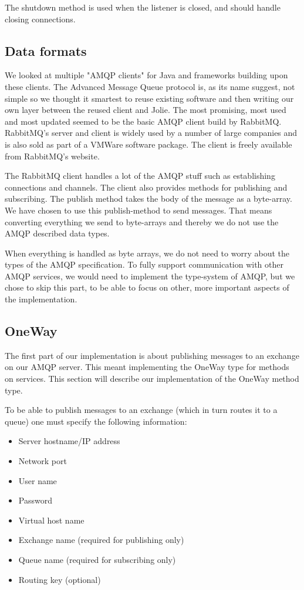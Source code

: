 The shutdown method is used when the listener is closed, and should handle closing connections.

\subsection{Data formats}
We looked at multiple "AMQP clients" for Java and frameworks building upon these clients. The Advanced Message Queue protocol is, as its name suggest, not simple so we thought it smartest to reuse existing software and then writing our own layer between the reused client and Jolie. The most promising, most used and most updated seemed to be the basic AMQP client build by RabbitMQ\cite{RabbitMqClient}. RabbitMQ's server and client is widely used by a number of large companies and is also sold as part of a VMWare software package\cite{vFabric}. The client is freely available from RabbitMQ's website.

The RabbitMQ client handles a lot of the AMQP stuff such as establishing connections and channels. The client also provides methods for publishing and subscribing. The publish method takes the body of the message as a byte-array. We have chosen to use this publish-method to send messages. That means converting everything we send to byte-arrays and thereby we do not use the AMQP described data types.

When everything is handled as byte arrays, we do not need to worry about the types of the AMQP specification. To fully support communication with other AMQP services, we would need to implement the type-system of AMQP, but we chose to skip this part, to be able to focus on other, more important aspects of the implementation.

\subsection{OneWay}
The first part of our implementation is about publishing messages to an exchange on our AMQP server. This meant implementing the OneWay type for methods on services. This section will describe our implementation of the OneWay method type.

To be able to publish messages to an exchange (which in turn routes it to a queue) one must specify the following information:
\begin{itemize}
\item Server hostname/IP address
\item Network port
\item User name
\item Password
\item Virtual host name
\item Exchange name (required for publishing only)
\item Queue name (required for subscribing only)
\item Routing key (optional)
\end{itemize}

